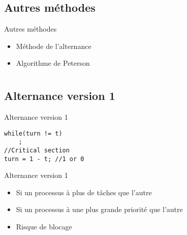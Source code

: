 \def\subsectitle{Autres méthodes}
\subsection{\subsectitle}
\begin{frame}{\sectitle}
\begin{block}{\subsectitle}
\begin{itemize}
\item Méthode de l'alternance
\item Algorithme de Peterson
\end{itemize}
\end{block}
\end{frame}
\def\sectitle{}
\section{\sectitle}
\begin{frame}[containsverbatim]{\sectitle}
\def\subsectitle{Alternance version 1}
\subsection{\subsectitle}
\begin{exampleblock}{\subsectitle}
\begin{verbatim}
while(turn != t)
    ;
//Critical section
turn = 1 - t; //1 or 0
\end{verbatim}
\end{exampleblock}

\begin{alertblock}{\subsectitle}
\begin{itemize}
    \item Si un processus à plus de tâches que l'autre
    \item Si un processus à une plus grande priorité que l'autre
    \item Risque de blocage
\end{itemize}
\end{alertblock}
\end{frame}

